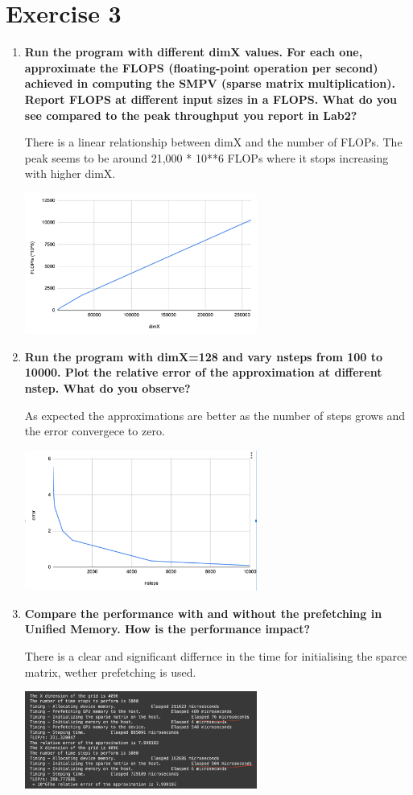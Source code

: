 \documentclass[a4paper,11pt]{scrartcl}
\begin{document}
\section*{Exercise 3}


\begin{enumerate}

    \item \textbf{Run the program with different dimX values. For each one, approximate the FLOPS (floating-point operation per second) achieved in computing the SMPV (sparse matrix multiplication). Report FLOPS at different input sizes in a FLOPS. What do you see compared to the peak throughput you report in Lab2?}

    There is a linear relationship between dimX and the number of FLOPs. The peak seems to be around 21,000 * 10**6 FLOPs where it stops increasing with higher dimX.

    \includegraphics*[width=0.6\textwidth]{images/flops2.png}

    \item \textbf{Run the program with dimX=128 and vary nsteps from 100 to 10000. Plot the relative error of the approximation at different nstep. What do you observe?}

    As expected the approximations are better as the number of steps grows and the error convergece to zero.

    \includegraphics*[width=0.6\textwidth]{images/nsteps.png}

    \item \textbf{Compare the performance with and without the prefetching in Unified Memory. How is the performance impact?}

    There is a clear and significant differnce in the time for initialising the sparce matrix, wether prefetching is used.

    \includegraphics*[width=0.6\textwidth]{images/prefetch.png}

\end{enumerate}
\end{document}

